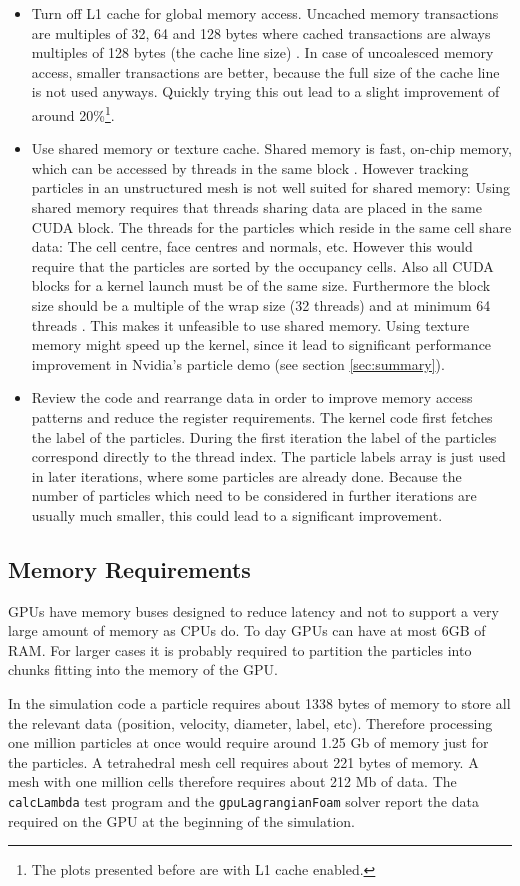 \begin{itemize}
    \item Turn off L1 cache for global memory access. Uncached memory transactions are multiples of 32, 64 and 128 bytes where cached transactions are always multiples of 128 bytes (the cache line size) \cite[F.4.2]{cudaguide}. In case of uncoalesced memory access, smaller transactions are better, because the full size of the cache line is not used anyways. Quickly trying this out lead to a slight improvement of around 20\%\footnote{The plots presented before are with L1 cache enabled.}.
    \item Use shared memory or texture cache. Shared memory is fast, on-chip memory, which can be accessed by threads in the same block \cite[3.2.3]{cudaguide}. However tracking particles in an unstructured mesh is not well suited for shared memory: Using shared memory requires that threads sharing data are placed in the same CUDA block. The threads for the particles which reside in the same cell share data: The cell centre, face centres and normals, etc. However this would require that the particles are sorted by the occupancy cells. Also all CUDA blocks for a kernel launch must be of the same size. Furthermore the block size should be a multiple of the wrap size (32 threads) and at minimum 64 threads \cite[4.4]{cudaBestPractices}. This makes it unfeasible to use shared memory. Using texture memory \cite[3.2.10.1]{cudaguide} might speed up the kernel, since it lead to significant performance improvement in Nvidia's particle demo (see section \ref{sec:summary}).
    \item Review the code and rearrange data in order to improve memory access patterns and reduce the register requirements. The kernel code first fetches the label of the particles. During the first iteration the label of the particles correspond directly to the thread index. The particle labels array is just used in later iterations, where some particles are already done. Because the number of particles which need to be considered in further iterations are usually much smaller, this could lead to a significant improvement. 
\end{itemize}

\subsection{Memory Requirements}

GPUs have memory buses designed to reduce latency and not to support a very large amount of memory as CPUs do. To day GPUs can have at most 6GB of RAM. For larger cases it is probably required to partition the particles into chunks fitting into the memory of the GPU.

In the simulation code a particle requires about 1338 bytes of memory to store all the relevant data (position, velocity, diameter, label, etc). Therefore processing one million particles at once would require around 1.25 Gb of memory just for the particles. A tetrahedral mesh cell requires about 221 bytes of memory. A mesh with one million cells therefore requires about 212 Mb of data. The \verb+calcLambda+ test program and the \verb+gpuLagrangianFoam+ solver report the data required on the GPU at the beginning of the simulation.